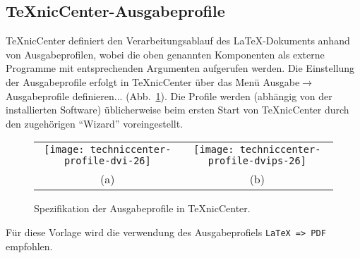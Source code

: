 \subsection{TeXnicCenter-Ausgabeprofile}
\label{sec:TeXnicCenterUndMikTeX}

TeXnicCenter definiert den Verarbeitungsablauf des LaTeX-Dokuments anhand von Ausgabeprofilen, wobei die oben genannten Komponenten als externe Programme mit entsprechenden Argumenten aufgerufen werden.
Die Einstellung der Ausgabeprofile erfolgt in TeXnicCenter über das Menü
\textsf{Ausgabe}$\rightarrow$\textsf{Ausgabeprofile definieren...} (Abb.\ \ref{fig:techniccenter-profile-latex}). 
Die Profile werden (abhängig von der installierten Software) üblicherweise beim ersten Start von TeXnicCenter durch den zugehörigen "`Wizard"' voreingestellt. 


\begin{figure}
\centering\small
\setlength{\tabcolsep}{0pt}%
\begin{tabular}{c@{~}c}
\texttt{[image: techniccenter-profile-dvi-26]} &
\texttt{[image: techniccenter-profile-dvips-26]} \\[4pt]
(a) & (b)
\end{tabular}
\caption{Spezifikation der Ausgabeprofile in TeXnicCenter.}
\label{fig:techniccenter-profile-latex}
\end{figure}

Für diese Vorlage wird die verwendung des Ausgabeprofiels \texttt{LaTeX => PDF} empfohlen.

